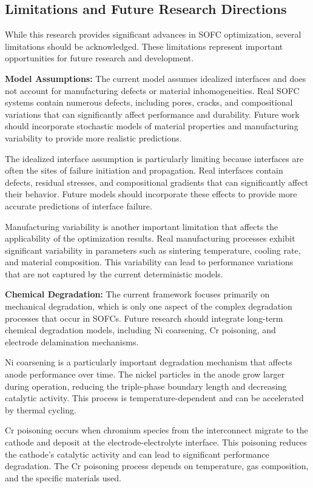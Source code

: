 \documentclass[conference]{IEEEtran}
\begin{document}
\subsection{Limitations and Future Research Directions}

While this research provides significant advances in SOFC optimization, several limitations should be acknowledged. These limitations represent important opportunities for future research and development.

\textbf{Model Assumptions:} The current model assumes idealized interfaces and does not account for manufacturing defects or material inhomogeneities. Real SOFC systems contain numerous defects, including pores, cracks, and compositional variations that can significantly affect performance and durability. Future work should incorporate stochastic models of material properties and manufacturing variability to provide more realistic predictions.

The idealized interface assumption is particularly limiting because interfaces are often the sites of failure initiation and propagation. Real interfaces contain defects, residual stresses, and compositional gradients that can significantly affect their behavior. Future models should incorporate these effects to provide more accurate predictions of interface failure.

Manufacturing variability is another important limitation that affects the applicability of the optimization results. Real manufacturing processes exhibit significant variability in parameters such as sintering temperature, cooling rate, and material composition. This variability can lead to performance variations that are not captured by the current deterministic models.

\textbf{Chemical Degradation:} The current framework focuses primarily on mechanical degradation, which is only one aspect of the complex degradation processes that occur in SOFCs. Future research should integrate long-term chemical degradation models, including Ni coarsening, Cr poisoning, and electrode delamination mechanisms.

Ni coarsening is a particularly important degradation mechanism that affects anode performance over time. The nickel particles in the anode grow larger during operation, reducing the triple-phase boundary length and decreasing catalytic activity. This process is temperature-dependent and can be accelerated by thermal cycling.

Cr poisoning occurs when chromium species from the interconnect migrate to the cathode and deposit at the electrode-electrolyte interface. This poisoning reduces the cathode's catalytic activity and can lead to significant performance degradation. The Cr poisoning process depends on temperature, gas composition, and the specific materials used.
\end{document}
